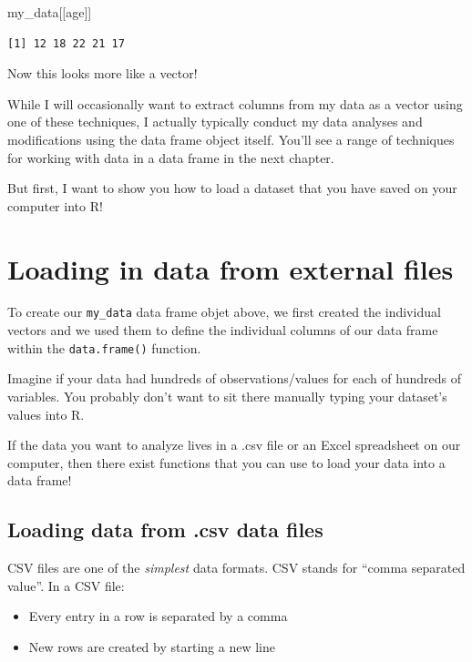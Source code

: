 \documentclass[
  letterpaper,
  DIV=11,
  numbers=noendperiod]{scrreprt}
\newenvironment{Shaded}{\begin{snugshade}}{\end{snugshade}}
\newcommand{\NormalTok}[1]{\textcolor[rgb]{0.00,0.23,0.31}{#1}}
\newcommand{\StringTok}[1]{\textcolor[rgb]{0.13,0.47,0.30}{#1}}
\begin{document}
\begin{Shaded}
\begin{Highlighting}[]
\NormalTok{my\_data[[}\StringTok{\textquotesingle{}age\textquotesingle{}}\NormalTok{]]}
\end{Highlighting}
\end{Shaded}

\begin{verbatim}
[1] 12 18 22 21 17
\end{verbatim}

Now this looks more like a vector!

While I will occasionally want to extract columns from my data as a
vector using one of these techniques, I actually typically conduct my
data analyses and modifications using the data frame object itself.
You'll see a range of techniques for working with data in a data frame
in the next chapter.

But first, I want to show you how to load a dataset that you have saved
on your computer into R!

\section{Loading in data from external
files}\label{loading-in-data-from-external-files}

To create our \texttt{my\_data} data frame objet above, we first created
the individual vectors and we used them to define the individual columns
of our data frame within the \texttt{data.frame()} function.

Imagine if your data had hundreds of observations/values for each of
hundreds of variables. You probably don't want to sit there manually
typing your dataset's values into R.

If the data you want to analyze lives in a .csv file or an Excel
spreadsheet on our computer, then there exist functions that you can use
to load your data into a data frame!

\subsection{Loading data from .csv data
files}\label{loading-data-from-.csv-data-files}

CSV files are one of the \emph{simplest} data formats. CSV stands for
``comma separated value''. In a CSV file:

\begin{itemize}
\item
  Every entry in a row is separated by a comma
\item
  New rows are created by starting a new line
\end{itemize}
\end{document}
